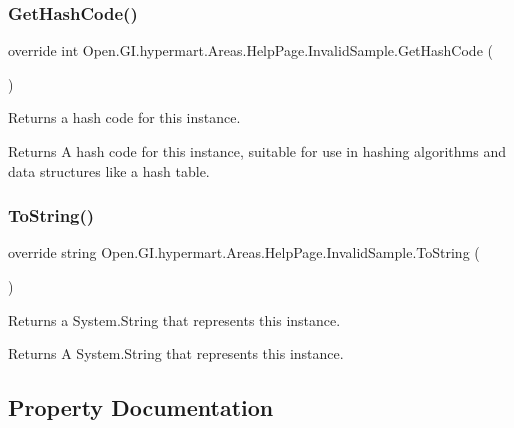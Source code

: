 \subsubsection{\texorpdfstring{Get\+Hash\+Code()}{GetHashCode()}}
{\footnotesize\ttfamily override int Open.\+G\+I.\+hypermart.\+Areas.\+Help\+Page.\+Invalid\+Sample.\+Get\+Hash\+Code (\begin{DoxyParamCaption}{ }\end{DoxyParamCaption})}



Returns a hash code for this instance. 

\begin{DoxyReturn}{Returns}
A hash code for this instance, suitable for use in hashing algorithms and data structures like a hash table. 
\end{DoxyReturn}
\hypertarget{class_open_1_1_g_i_1_1hypermart_1_1_areas_1_1_help_page_1_1_invalid_sample_ac19ab8008f61f08252bad6d7c063e7bd}{}\label{class_open_1_1_g_i_1_1hypermart_1_1_areas_1_1_help_page_1_1_invalid_sample_ac19ab8008f61f08252bad6d7c063e7bd} 
\subsubsection{\texorpdfstring{To\+String()}{ToString()}}
{\footnotesize\ttfamily override string Open.\+G\+I.\+hypermart.\+Areas.\+Help\+Page.\+Invalid\+Sample.\+To\+String (\begin{DoxyParamCaption}{ }\end{DoxyParamCaption})}



Returns a System.\+String that represents this instance. 

\begin{DoxyReturn}{Returns}
A System.\+String that represents this instance. 
\end{DoxyReturn}


\subsection{Property Documentation}
\hypertarget{class_open_1_1_g_i_1_1hypermart_1_1_areas_1_1_help_page_1_1_invalid_sample_a89f95b69edc57c57963b214d0bc844af}{}\label{class_open_1_1_g_i_1_1hypermart_1_1_areas_1_1_help_page_1_1_invalid_sample_a89f95b69edc57c57963b214d0bc844af} 
